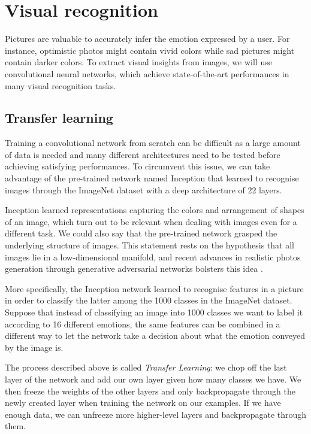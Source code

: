 \documentclass{article} %
\begin{document}
\section{Visual recognition}
Pictures are valuable to accurately infer the emotion expressed by a user. For instance, optimistic photos might contain vivid colors while sad pictures might contain darker colors. To extract visual insights from images, we will use convolutional neural networks, which achieve state-of-the-art performances in many visual recognition tasks.

\subsection{Transfer learning}
Training a convolutional network from scratch can be difficult as a large amount of data is needed and many different architectures need to be tested before achieving satisfying performances. To circumvent this issue, we can take advantage of the pre-trained network named Inception that learned to recognise images through the ImageNet dataset with a deep architecture of 22 layers.

Inception learned representations capturing the colors and arrangement of shapes of an image, which turn out to be relevant when dealing with images even for a different task. We could also say that the pre-trained network grasped the underlying structure of images. This statement rests on the hypothesis that all images lie in a low-dimensional manifold, and recent advances in realistic photos generation through generative adversarial networks bolsters this idea \citep{Radford-16}. 

More specifically, the Inception network learned to recognise features in a picture in order to classify the latter among the 1000 classes in the ImageNet dataset. Suppose that instead of classifying an image into 1000 classes we want to label it according to 16 different emotions, the same features can be combined in a different way to let the network take a decision about what the emotion conveyed by the image is.

The process described above is called {\em Transfer Learning}: we chop off the last layer of the network and add our own layer given how many classes we have. We then freeze the weights of the other layers and only backpropagate through the newly created layer when training the network on our examples. If we have enough data, we can unfreeze more higher-level layers and backpropagate through them.
\end{document}
